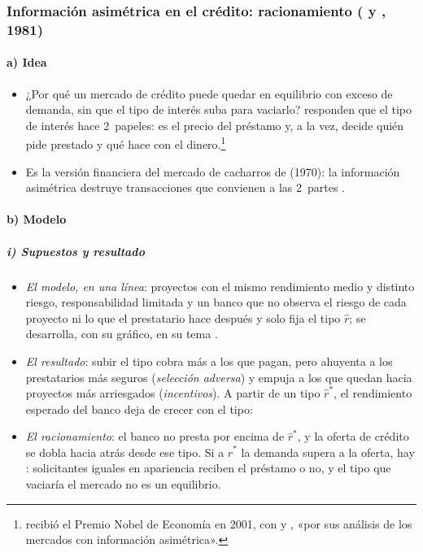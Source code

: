 \documentclass[11pt]{article}
\begin{document}
\subsubsection{Información asimétrica en el crédito: racionamiento ( y , 1981)}\label{sec:stiglitz-weiss}

\paragraph{a) Idea}

\begin{itemize}
\item ¿Por qué un mercado de crédito puede quedar en equilibrio con exceso de demanda, sin que el tipo de interés suba para vaciarlo? \textcite{StiglitzWeiss1981Credit} responden que el tipo de interés hace 2~papeles: es el precio del préstamo y, a la vez, decide quién pide prestado y qué hace con el dinero.\footnote{ recibió el Premio Nobel de Economía en 2001, con  y , «por sus análisis de los mercados con información asimétrica»\nocite{Nobel2001AkerlofSpenceStiglitz}.}
\item Es la versión financiera del mercado de cacharros de  (1970): la información asimétrica destruye transacciones que convienen a las 2~partes\nocite{Akerlof1970Market} .
\end{itemize}

\paragraph{b) Modelo}

\subparagraph{i) Supuestos y resultado}

\begin{itemize}
\item \emph{El modelo, en una línea}: proyectos con el mismo rendimiento medio y distinto riesgo, responsabilidad limitada y un banco que no observa el riesgo de cada proyecto ni lo que el prestatario hace después y solo fija el tipo $\hat r$; se desarrolla, con su gráfico, en su tema .
\item \emph{El resultado}: subir el tipo cobra más a los que pagan, pero ahuyenta a los prestatarios más seguros (\emph{selección adversa}) y empuja a los que quedan hacia proyectos más arriesgados (\emph{incentivos}). A partir de un tipo $\hat r^*$, el rendimiento esperado del banco deja de crecer con el tipo:
\item \emph{El racionamiento}: el banco no presta por encima de $\hat r^*$, y la oferta de crédito se dobla hacia atrás desde ese tipo. Si a $\hat r^*$ la demanda supera a la oferta, hay : solicitantes iguales en apariencia reciben el préstamo o no, y el tipo que vaciaría el mercado no es un equilibrio.
\end{itemize}
\end{document}
